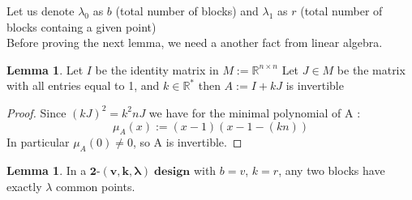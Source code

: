 \documentclass[12pt]{article}
\theoremstyle{definition}
\newtheorem{lemma}[theorem]{Lemma}
\numberwithin{equation}{theorem}
\numberwithin{figure}{theorem}
\newcommand{\tParamDesign}[4]{\ensuremath{\bm{#1\mbox{-}(#2,#3,#4)\; design}}}
\newcommand{\myMatrixRing}[2]{\ensuremath{#1^{#2\times#2}}}
\begin{document}
Let us denote $\lambda_0$ as $b$ (total number of blocks) and
$\lambda_1$ as $r$ (total number of blocks containg a given point)\\
Before proving the next lemma, we need a another fact from linear algebra.
\begin{lemma}\label{invertible}
Let $I$ be the identity matrix in {$M := \myMatrixRing{\mathbb{R}}{n}$} Let $J \in M$ be the matrix with all entries equal to 1, and $k \in \mathbb{R}^*$ then $A := I + kJ$ is invertible
\end{lemma}
\begin{proof}
Since $(kJ)^2 = k^2 n J$ we have for the minimal polynomial of A :
\[
	\mu_A(x) := (x - 1)(x - 1 - (kn))
\]
In particular $\mu_A(0) \neq 0$, so A is invertible.
\end{proof}
\begin{lemma}\label{lambdaCommonPoints}
In a {\tParamDesign{2}{v}{k}{\lambda}} with $b = v$, $k = r$, any two blocks have exactly $\lambda$ common points.
\end{lemma}
\end{document}
